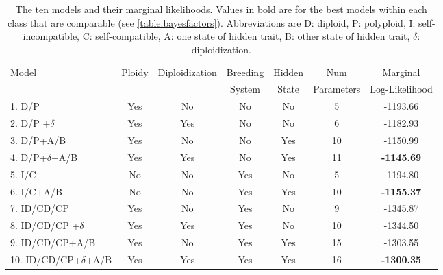 
\begin{table}
\begin{tabular}{lcccccc} \toprule
Model                        & Ploidy & Diploidization & Breeding  & Hidden & Num & Marginal \\
                             & &  &System & State & Parameters & Log-Likelihood \\ \midrule
1. D/P           &	Yes & 	No	& No	& No & 	5 &	-1193.66\\
2. D/P +$\delta$                      &	Yes  &	Yes &	No	&No	& 6	& -1182.93 \\
3. D/P+A/B        &	Yes & No &	No &	Yes &	10	&-1150.99\\
4. D/P+$\delta$+A/B                   &	Yes &	Yes	&No &	Yes &	11 &	\textbf{-1145.69}\\
5. I/C                       &	No & No	&Yes &	No &	 5 &  -1194.80 \\
6. I/C+A/B                   &	No &	 No	&Yes &	Yes	& 10 & \textbf{-1155.37}\\
7. ID/CD/CP      &	Yes & 	No &	Yes	&No &	9 &-1345.87\\
8. ID/CD/CP +$\delta$                 &	Yes & 	Yes &	Yes &	No &	10 & -1344.50\\
9. ID/CD/CP+A/B  & Yes & 	No	&Yes &	Yes	&15 &-1303.55 \\ 
10. ID/CD/CP+$\delta$+A/B              &	Yes 	&Yes &	Yes &	Yes &	16 & \textbf{-1300.35} \\
\bottomrule
\end{tabular}
\caption{
    The ten models and their marginal likelihoods.
    Values in bold are for the best models within each class that are comparable (see \cref{table:bayesfactors}).
    Abbreviations are D: diploid, P: polyploid, I: self-incompatible, C: self-compatible, A: one state of hidden trait, B: other state of hidden trait, $\delta$: diploidization.}
\label{table:marginallike}
\end{table}


